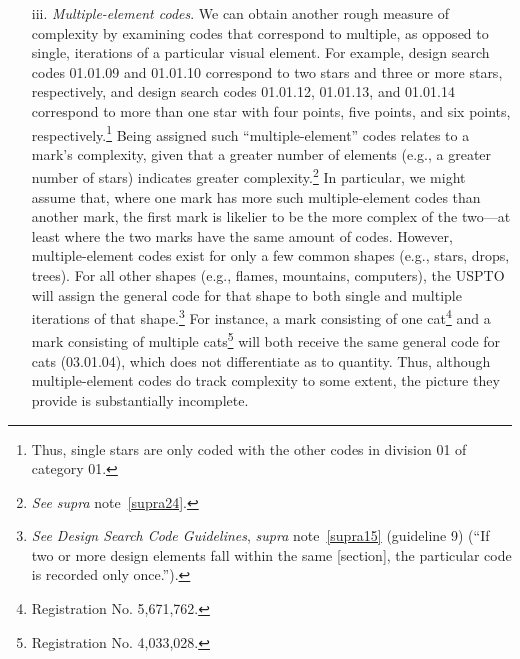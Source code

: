 \documentclass[letterpaper, 11pt, oneside]{article}
\begin{document}
\begin{enumerate}
\noindent But the mark on the left is fairly intricate and contains a substantial amount of ellipses/circles. It may not fall into the category of basic shapes. Conversely, marks whose only design search codes are in categories other than 01, 25, or 26 can still be simple—for example, the mark \texttt{[image: RN\_7099151\_drawing]},\footnote{Registration No. 7,099,151} whose only code is 06.01.04 (``mountains, mountain landscapes''). Accordingly, a mark's number of non-basic codes provides only a very rough measure of its complexity.

\item[iii.] \textit{Multiple-element codes}. We can obtain another rough measure of complexity by examining codes that correspond to multiple, as opposed to single, iterations of a particular visual element. For example, design search codes 01.01.09 and 01.01.10 correspond to two stars and three or more stars, respectively, and design search codes 01.01.12, 01.01.13, and 01.01.14 correspond to more than one star with four points, five points, and six points, respectively.\footnote{Thus, single stars are only coded with the other codes in division 01 of category 01.} Being assigned such ``multiple-element'' codes relates to a mark's complexity, given that a greater number of elements (e.g., a greater number of stars) indicates greater complexity.\footnote{\textit{See supra} note~\ref{supra24}.} In particular, we might assume that, where one mark has more such multiple-element codes than another mark, the first mark is likelier to be the more complex of the two—at least where the two marks have the same amount of codes. However, multiple-element codes exist for only a few common shapes (e.g., stars, drops, trees). For all other shapes (e.g., flames, mountains, computers), the USPTO will assign the general code for that shape to both single and multiple iterations of that shape.\footnote{\textit{See Design Search Code Guidelines}, \textit{supra} note~\ref{supra15} (guideline 9) (``If two or more design elements fall within the same [section], the particular code is recorded only once.'').} For instance, a mark consisting of one cat\footnote{Registration No. 5,671,762.} and a mark consisting of multiple cats\footnote{Registration No. 4,033,028.} will both receive the same general code for cats (03.01.04), which does not differentiate as to quantity. Thus, although multiple-element codes do track complexity to some extent, the picture they provide is substantially incomplete.

\end{enumerate}
\end{document}

